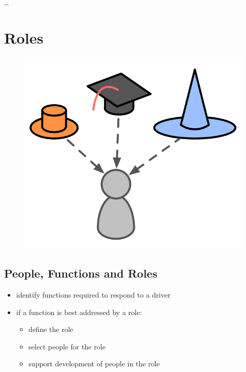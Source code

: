 {\ldots}

\chapter{Roles}
\label{roles}

\begin{figure}[htbp]
\centering
\includegraphics[keepaspectratio,width=\textwidth,height=0.75\textheight]{img/people-and-roles/roles.png}
\end{figure}

\section{People, Functions and Roles}
\label{peoplefunctionsandroles}

\begin{itemize}
\item identify functions required to respond to a driver

\item if a function is best addressed by a role:

\begin{itemize}
\item define the role

\item select people for the role

\item support development of people in the role

\end{itemize}

\end{itemize}

